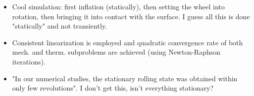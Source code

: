 \documentclass{article}
\begin{document}
\begin{itemize}
\item Cool simulation: first inflation (statically), then setting the wheel into rotation, then bringing it into contact with the surface. I guess all this is done "statically" and not transiently.
\item Consistent linearization is employed and quadratic convergence rate of both mech. and therm. subproblems are achieved (using Newton-Raphson iterations).
\item "In our numerical studies, the stationary rolling state was obtained within only few revolutions". I don't get this, isn't everything stationary?
\end{itemize}
\end{document}
